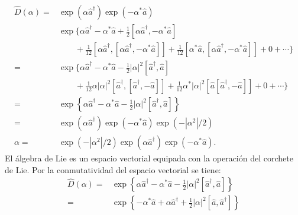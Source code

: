 \begin{enumerate}
\begin{align}
          \hat{D}(\alpha) = & \exp{(\alpha \hat{a}^{\dagger})}\exp{(-\alpha^* \hat{a})}                                                                                                                                    \nonumber \\
                            & \exp \Bigg\{ \alpha \hat{a}^{\dagger} - \alpha^* \hat{a} + \frac{1}{2}[\alpha\hat{a}^{\dagger}, - \alpha^* \hat{a}]                                                                          \nonumber \\
                            & \qquad +\frac{1}{12}[\alpha\hat{a}^{\dagger},[\alpha\hat{a}^{\dagger}, - \alpha^*\hat{a}]] +\frac{1}{12}[\alpha^*\hat{a},[\alpha\hat{a}^{\dagger}, - \alpha^* \hat{a}]] + 0 + \cdots \Bigg\} \nonumber \\
          =                 & \exp \Bigg\{ \alpha \hat{a}^{\dagger} - \alpha^* \hat{a} - \frac{1}{2}|\alpha|^2[\hat{a}^{\dagger},\hat{a}]                                                                                  \nonumber \\
                            & \qquad +\frac{1}{12}\alpha |\alpha|^2[\hat{a}^{\dagger},[\hat{a}^{\dagger},-\hat{a}]] +\frac{1}{12}\alpha^*|\alpha|^2[\hat{a}[\hat{a}^{\dagger},-\hat{a}]] + 0 + \cdots \Bigg\}             \nonumber  \\
          =                 & \exp \left\{ \alpha \hat{a}^{\dagger} - \alpha^{*}\hat{a} - \frac{1}{2}|\alpha|^2[\hat{a}^{\dagger},\hat{a}] \right\}                                                                        \nonumber \\
          =                 & \exp(\alpha\hat{a}^{\dagger})\exp(-\alpha^{*} \hat{a})\exp(-|\alpha^2|/2)                                                                                                                   \nonumber  \\
          \alpha =          & \exp(-|\alpha^2|/2)\exp(\alpha\hat{a}^{\dagger})\exp(-\alpha^{*} \hat{a}).
        \end{align}
        El álgebra de Lie es un espacio vectorial equipada con la operación del corchete de Lie. Por la conmutatividad del espacio vectorial se tiene:
        \begin{align}
          \hat{D}(\alpha) = & \exp \left\{ \alpha \hat{a}^{\dagger} - \alpha^{*} \hat{a} - \frac{1}{2}|\alpha|^2[\hat{a}^{\dagger},\hat{a}] \right\}    \nonumber \\
          =                 & \exp \left\{ - \alpha^{*} \hat{a} + \alpha \hat{a}^{\dagger}  + \frac{1}{2}|\alpha|^2[\hat{a},\hat{a}^{\dagger}] \right\} \nonumber \\

\end{align}
\end{enumerate}
